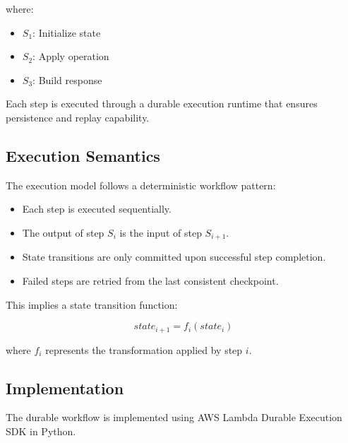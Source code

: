 where:

\begin{itemize}
    \item $S_1$: Initialize state
    \item $S_2$: Apply operation
    \item $S_3$: Build response
\end{itemize}

Each step is executed through a durable execution runtime that ensures persistence and replay capability.

\subsection{Execution Semantics}

The execution model follows a deterministic workflow pattern:

\begin{itemize}
    \item Each step is executed sequentially.
    \item The output of step $S_i$ is the input of step $S_{i+1}$.
    \item State transitions are only committed upon successful step completion.
    \item Failed steps are retried from the last consistent checkpoint.
\end{itemize}

This implies a state transition function:

\begin{equation}
state_{i+1} = f_i(state_i)
\end{equation}

where $f_i$ represents the transformation applied by step $i$.

\subsection{Implementation}

The durable workflow is implemented using AWS Lambda Durable Execution SDK in Python.

